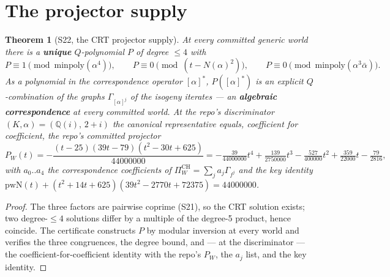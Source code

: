 \documentclass[11pt]{article}
\newtheorem{theorem}{Theorem}[section]
\begin{document}
\section{The projector supply}

\begin{theorem}[S22, the CRT projector supply]\label{thm:s22}
At every committed generic world there is a \textbf{unique} $Q$-polynomial
$P$ of degree $\le 4$ with
\[
P \equiv 1 \pmod{\mathrm{minpoly}(\alpha^4)},\qquad
P \equiv 0 \pmod{(t - N(\alpha)^2)},\qquad
P \equiv 0 \pmod{\mathrm{minpoly}(\alpha^3\bar\alpha)}.
\]
As a polynomial in the correspondence operator $[\alpha]^*$, $P([\alpha]^*)$
is an explicit $Q$-combination of the graphs $\Gamma_{[\alpha]^j}$ of the
isogeny iterates --- an \textbf{algebraic correspondence} at every committed
world. At the repo's discriminator $(K,\alpha) = (\mathbb{Q}(i),\,2+i)$ the
canonical representative equals, coefficient for coefficient, the repo's
committed projector
\[
P_W(t) = -\frac{(t-25)(39t-79)(t^2-30t+625)}{44000000}
= -\tfrac{39}{44000000}t^4 + \tfrac{139}{2750000}t^3
- \tfrac{527}{400000}t^2 + \tfrac{359}{22000}t - \tfrac{79}{2816},
\]
with $a_0..a_4$ the correspondence coefficients of
$\Pi_W^{\mathrm{CH}} = \sum_j a_j\Gamma_{f^j}$ and the key identity
$\mathrm{pwN}(t) + (t^2{+}14t{+}625)(39t^2{-}2770t{+}72375) = 44000000$.
\end{theorem}

\begin{proof}
The three factors are pairwise coprime (S21), so the CRT solution exists;
two degree-$\le 4$ solutions differ by a multiple of the degree-5 product,
hence coincide. The certificate constructs $P$ by modular inversion at every
world and verifies the three congruences, the degree bound, and --- at the
discriminator --- the coefficient-for-coefficient identity with the repo's
$P_W$, the $a_j$ list, and the key identity.
\end{proof}
\end{document}
